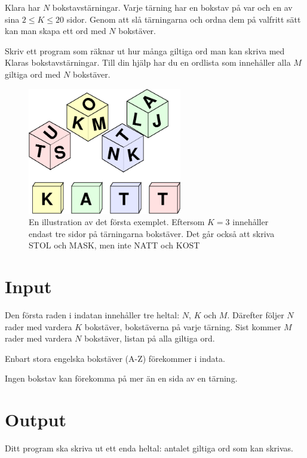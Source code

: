
Klara har $N$ bokstavstärningar.
Varje tärning har en bokstav på var och en av sina $2 \le K \le 20$ sidor.
Genom att slå tärningarna och ordna dem på valfritt sätt kan man skapa ett ord med $N$ bokstäver.

Skriv ett program som räknar ut hur många giltiga ord man kan skriva med Klaras bokstavstärningar.
Till din hjälp har du en ordlista som innehåller alla $M$ giltiga ord med $N$ bokstäver.

\begin{figure}[ht!]
\centering
\includegraphics[width=0.6\textwidth]{tarningar.png}
\caption{En illustration av det första exemplet. Eftersom $K=3$ innehåller endast tre sidor på tärningarna bokstäver. Det går också att skriva STOL och MASK, men inte NATT och KOST}
\label{overflow}
\end{figure}

\section*{Input}

Den första raden i indatan innehåller tre heltal: $N$, $K$ och $M$.
Därefter följer $N$ rader med vardera $K$ bokstäver, bokstäverna på varje tärning.
Sist kommer $M$ rader med vardera $N$ bokstäver, listan på alla giltiga ord.

Enbart stora engelska bokstäver (A-Z) förekommer i indata.

Ingen bokstav kan förekomma på mer än en sida av en tärning.

\section*{Output}

Ditt program ska skriva ut ett enda heltal: antalet giltiga ord som kan skrivas.


